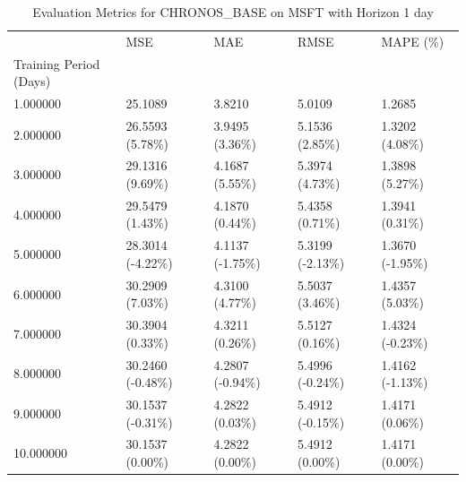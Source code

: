 \begin{table}
\caption{Evaluation Metrics for CHRONOS_BASE on MSFT with Horizon 1 day}
\label{tab:chronos_base_MSFT_h1_metrics}
\begin{tabular}{lllll}
\toprule
 & MSE & MAE & RMSE & MAPE (\%) \\
Training Period (Days) &  &  &  &  \\
\midrule
1.000000 & 25.1089 & 3.8210 & 5.0109 & 1.2685 \\
2.000000 & 26.5593 (5.78\%) & 3.9495 (3.36\%) & 5.1536 (2.85\%) & 1.3202 (4.08\%) \\
3.000000 & 29.1316 (9.69\%) & 4.1687 (5.55\%) & 5.3974 (4.73\%) & 1.3898 (5.27\%) \\
4.000000 & 29.5479 (1.43\%) & 4.1870 (0.44\%) & 5.4358 (0.71\%) & 1.3941 (0.31\%) \\
5.000000 & 28.3014 (-4.22\%) & 4.1137 (-1.75\%) & 5.3199 (-2.13\%) & 1.3670 (-1.95\%) \\
6.000000 & 30.2909 (7.03\%) & 4.3100 (4.77\%) & 5.5037 (3.46\%) & 1.4357 (5.03\%) \\
7.000000 & 30.3904 (0.33\%) & 4.3211 (0.26\%) & 5.5127 (0.16\%) & 1.4324 (-0.23\%) \\
8.000000 & 30.2460 (-0.48\%) & 4.2807 (-0.94\%) & 5.4996 (-0.24\%) & 1.4162 (-1.13\%) \\
9.000000 & 30.1537 (-0.31\%) & 4.2822 (0.03\%) & 5.4912 (-0.15\%) & 1.4171 (0.06\%) \\
10.000000 & 30.1537 (0.00\%) & 4.2822 (0.00\%) & 5.4912 (0.00\%) & 1.4171 (0.00\%) \\
\bottomrule
\end{tabular}
\end{table}
